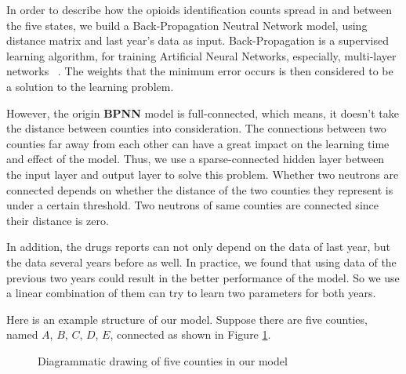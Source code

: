 \documentclass{mcmthesis}
\begin{document}
In order to describe how the opioids identification counts spread in and between the five states, we build a Back-Propagation Neutral Network model, using distance matrix and last year's data as input. Back-Propagation is a supervised learning algorithm, for training Artificial Neural Networks, especially,  multi-layer networks ~\cite{AI}. The weights that the minimum error occurs is then considered to be a solution to the learning problem. 

However, the origin \textbf{BPNN} model is full-connected, which means, it doesn't take the distance between counties into consideration. The connections between two counties far away from each other can have a great impact on the learning time and effect of the model. Thus, we use a sparse-connected hidden layer between the input layer and output layer to solve this problem. Whether two neutrons are connected depends on whether the distance of the two counties they represent is under a certain threshold. Two neutrons of same counties are connected since their distance is zero.

In addition, the drugs reports can not only depend on the data of last year, but the data several years before as well. In practice, we found that using data of the previous two years could result in the better performance of the model. So we use a linear combination of them can try to learn two parameters for both years.

Here is an example structure of our model. Suppose there are five counties, named $A$, $B$, $C$, $D$, $E$, connected as shown in Figure \ref{fig:example}.

\begin{figure}[H]
    \centering
    \caption{Diagrammatic drawing of five counties in our model}
    \label{fig:example}
\end{figure}
\end{document}

